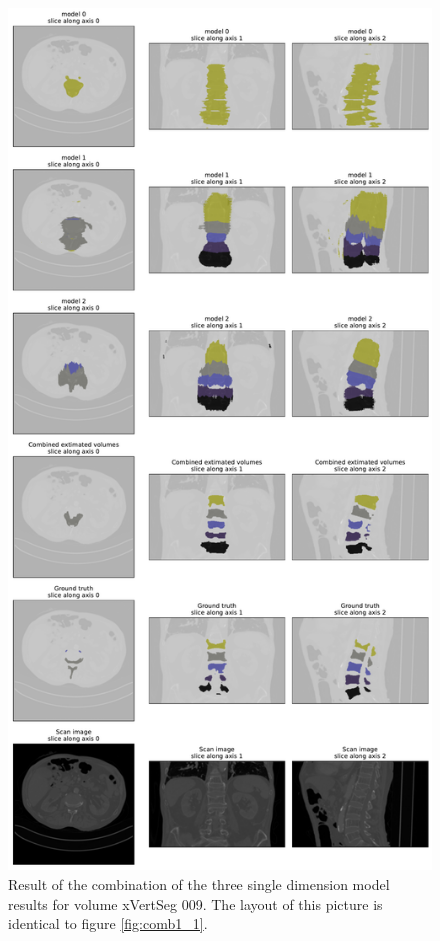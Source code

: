 \begin{figure}
    \centering
    \includegraphics[width=.90\textwidth]{images/comb1_denoise2_erode1_xVertSeg_009.pdf}
    \caption{
        Result of the combination of the three single dimension model results for volume xVertSeg 009. The layout of this picture is identical to figure \ref{fig:comb1_1}.
        \protect
        \label{fig:comb1_2}
    }
\end{figure}
